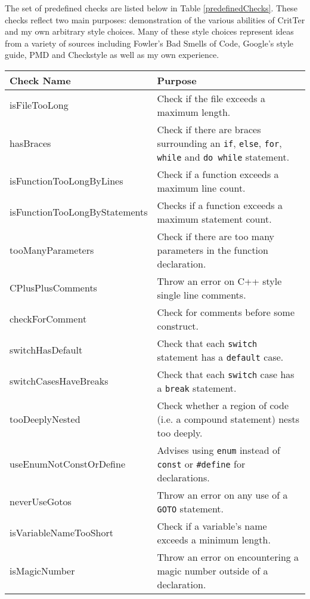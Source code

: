 \documentclass[12pt]{report}
\newcommand{\programName}{CritTer\xspace}
\begin{document}
The set of predefined checks are listed below in Table \ref{predefinedChecks}. These checks reflect 
two main purposes: demonstration of the various abilities of \programName and my own arbitrary style 
choices. Many of these style choices represent ideas from a variety of sources including Fowler's Bad 
Smells of Code\cite{refactoring}, Google's style guide\cite{googleStyle}, PMD\cite{pmd} and 
Checkstyle\cite{checkstyle} as well as my own experience.

\begin{table}
	\begin{center}
	\begin{tabular}{l p{10cm}}
		\toprule
		Check Name & Purpose \\
		\midrule
		isFileTooLong & Check if the file exceeds a maximum length. \\
		hasBraces & Check if there are braces surrounding an \lstinline!if!, \lstinline!else!, \lstinline!for!, \lstinline!while! and \lstinline!do while! statement. \\
		isFunctionTooLongByLines & Check if a function exceeds a maximum line count. \\
		isFunctionTooLongByStatements & Checks if a function exceeds a maximum statement count. \\
		tooManyParameters & Check if there are too many parameters in the function declaration. \\
		CPlusPlusComments & Throw an error on C++ style single line comments. \\
		checkForComment & Check for comments before some construct. \\
		switchHasDefault & Check that each \lstinline!switch! statement has a \lstinline!default! case. \\
		switchCasesHaveBreaks & Check that each \lstinline!switch! case has a \lstinline!break! statement. \\
		tooDeeplyNested & Check whether a region of code (i.e. a compound statement) nests too deeply. \\
		useEnumNotConstOrDefine & Advises using \lstinline!enum! instead of \lstinline!const! or \lstinline!#define! for declarations. \\
		neverUseGotos & Throw an error on any use of a \lstinline!GOTO! statement. \\
		isVariableNameTooShort & Check if a variable's name exceeds a minimum length. \\
		isMagicNumber & Throw an error on encountering a magic number outside of a declaration. \\

\end{tabular}
\end{center}
\end{table}
\end{document}
